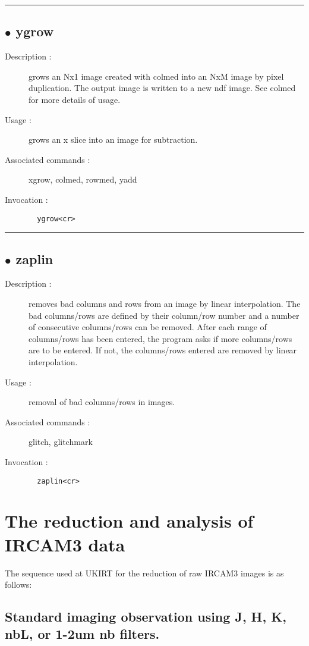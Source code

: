 \hrule \subsection*{$\bullet$ ygrow}
\begin{description}
\item[Description :] grows an Nx1 image created with colmed into an NxM image by pixel
duplication.  The output image is written to a new ndf image.  See colmed
for more details of usage.
\item[Usage :] grows an x slice into an image for subtraction.
\item[Associated commands :] xgrow, colmed, rowmed, yadd
\item[Invocation :]

\verb+  ygrow<cr> +\end{description}

\hrule \subsection*{$\bullet$ zaplin}
\begin{description}
\item[Description :] removes bad columns and rows from an image by linear
interpolation.  The bad columns/rows are defined by their column/row
number and a number of consecutive columns/rows can be removed.  After
each range of columns/rows has been entered, the program asks if more
columns/rows are to be entered.  If not, the columns/rows entered are
removed by linear interpolation.
\item[Usage :] removal of bad columns/rows in images.
\item[Associated commands :] glitch, glitchmark
\item[Invocation :]

\verb+  zaplin<cr> +\end{description}


\section{The reduction and analysis of {\sc IRCAM3} data}
 
The sequence used at {\sc UKIRT} for the reduction of raw {\sc IRCAM3}
images is as follows:
 
\subsection{Standard imaging observation using J, H, K, nbL, or 1-2um nb filters.}

